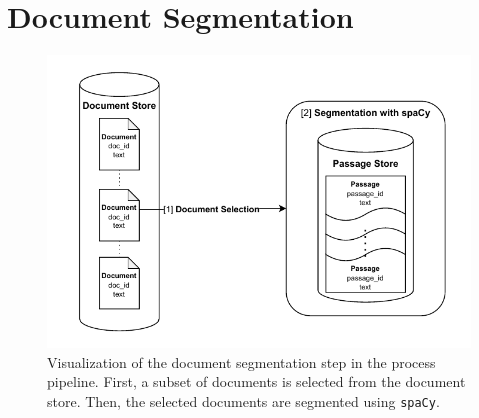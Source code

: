 \section{Document Segmentation}\label{document-segmentation}

\begin{figure}[t]
    \centering
    \includegraphics[width=\textwidth]{./graphics/drawio/document_segmentation.pdf}
    \caption{Visualization of the document segmentation step in the process pipeline. First, a subset of documents is selected from the document store. Then, the selected documents are segmented using \texttt{spaCy}.}
    \label{fig:document-segmentation}
\end{figure}

